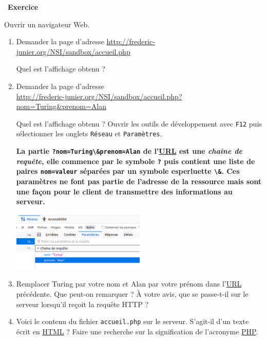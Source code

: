 \documentclass[
  11pt,
]{article}
\newcommand{\passthrough}[1]{#1}
\newcounter{exo}
\newenvironment{exercice}[1]
{\par \medskip   \addtocounter{exo}{1} \noindent  
\begin{bclogo}[arrondi =0.1,   noborder = true, logo=\bccrayon, marge=4]{~\textbf{Exercice} \textbf{\theexo} {\itshape #1} }  \par}
{
\end{bclogo}
 \par \bigskip }
\newcounter{rque}
\newcounter{def}
\begin{document}
\begin{exercice}{}

Ouvrir un navigateur Web.

\begin{enumerate}
\def\labelenumi{\arabic{enumi}.}
\item
  Demander la page d'adresse
  \href{https://frederic-junier.org/NSI/sandbox/accueil.php}{http://frederic-junier.org/NSI/sandbox/accueil.php}

  Quel est l'affichage obtenu ?
\item
  Demander la page d'adresse\\
  \href{https://frederic-junier.org/NSI/sandbox/accueil.php?nom=Turing\&prenom=Alan}{http://frederic-junier.org/NSI/sandbox/accueil.php?nom=Turing\&prenom=Alan}

  Quel est l'affichage obtenu ? Ouvrir les outils de développement avec
  \passthrough{\lstinline!F12!} puis sélectionner les onglets
  \passthrough{\lstinline!Réseau!} et
  \passthrough{\lstinline!Paramètres!}.

  \textbf{La partie \passthrough{\lstinline!?nom=Turing\&prenom=Alan!}
  de l'\href{https://developer.mozilla.org/fr/docs/Glossaire/URL}{URL}
  est une \emph{chaîne de requête}, elle commence par le symbole
  \passthrough{\lstinline!?!} puis contient une liste de paires
  \passthrough{\lstinline!nom=valeur!} séparées par un symbole
  esperluette \passthrough{\lstinline!\&!}. Ces paramètres ne font pas
  partie de l'adresse de la ressource mais sont une façon pour le client
  de transmettre des informations au serveur.}

  \includegraphics[width=0.5\textwidth,height=\textheight]{images/parametres1.png}\\
\item
  Remplacer Turing par votre nom et Alan par votre prénom dans
  l'\href{https://developer.mozilla.org/fr/docs/Glossaire/URL}{URL}
  précédente. Que peut-on remarquer ? À votre avis, que se passe-t-il
  sur le serveur lorsqu'il reçoit la requête HTTP ?
\item
  Voici le contenu du fichier \passthrough{\lstinline!accueil.php!} sur
  le serveur. S'agit-il d'un texte écrit en
  \href{https://developer.mozilla.org/fr/docs/Glossaire/HTML}{HTML} ?
  Faire une recherche sur la signification de l'acronyme
  \href{https://developer.mozilla.org/fr/docs/Glossaire/PHP}{PHP}.
\end{enumerate}


\end{exercice}
\end{document}
